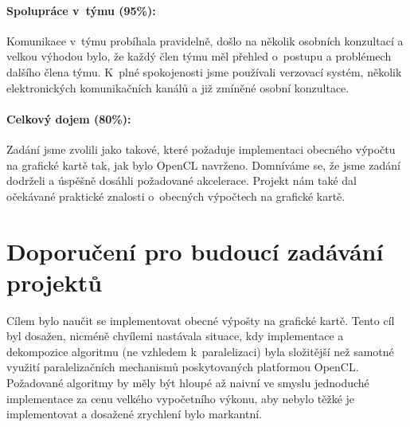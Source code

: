 \documentclass[11pt,a4paper]{article}
\begin{document}
\paragraph{Spolupráce v~týmu (95\%):}
Komunikace v~týmu probíhala pravidelně, došlo na několik osobních konzultací a velkou výhodou bylo, že každý člen týmu měl přehled o~postupu a problémech dalšího člena týmu. K~plné spokojenosti jsme používali verzovací systém, několik elektronických komunikačních kanálů a již zmíněné osobní konzultace.

\paragraph{Celkový dojem (80\%):}
Zadání jsme zvolili jako takové, které požaduje implementaci obecného výpočtu na grafické kartě tak, jak bylo OpenCL navrženo. Domníváme se, že jsme zadání dodrželi a úspěšně dosáhli požadované akcelerace. Projekt nám také dal očekávané praktické znalosti o~obecných výpočtech na grafické kartě.

\section{Doporučení pro budoucí zadávání projektů}
Cílem bylo naučit se implementovat obecné výpošty na grafické kartě. Tento cíl byl dosažen, nicméně chvílemi nastávala situace, kdy implementace a dekompozice algoritmu (ne vzhledem k~paralelizaci) byla složitější než samotné využití paralelizačních mechanismů poskytovaných platformou OpenCL. Požadované algoritmy by měly být hloupé až naivní ve smyslu jednoduché implementace za cenu velkého vypočetního výkonu, aby nebylo těžké je implementovat a dosažené zrychlení bylo markantní.
\end{document}
